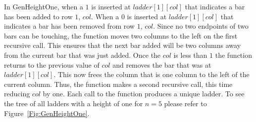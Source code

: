    In {\sc GenHeightOne}, when a $1$ is inserted at $ladder[1][col]$ that indicates a bar has been added to row $1$, $col$. When a $0$ is 
   inserted at $ladder[1][col]$ that indicates a bar has been removed from row $1$, $col$. Since no two endpoints of two bars can be touching, 
   the function moves two columns to the 
   left on the first recursive call. This ensures that the next bar added will be two columns away from the current bar that was just added. 
   Once the $col$ is less than $1$ the function returns to the previous value of $col$ and removes the bar that was at $ladder[1][col]$. 
   This now frees the column that is one column to the left of the current column. 
   Thus, the function makes a second recursive call, this time reducing $col$ by one. 
   Each call to the function produces a unique ladder. To see the tree of all ladders with a height of one for $n=5$ please refer to Figure~\ref{Fig:GenHeightOne}.
